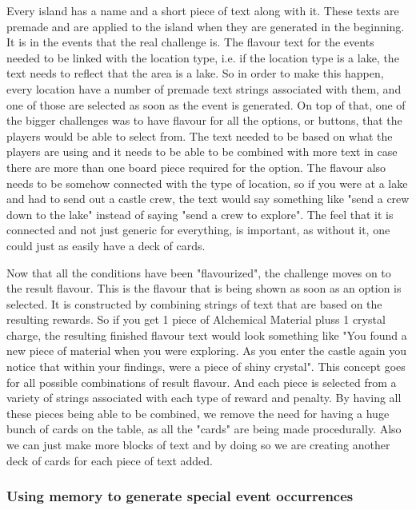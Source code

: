 Every island has a name and a short piece of text along with it. These texts are premade and are applied to the island when they are generated in the beginning. 
It is in the events that the real challenge is. The flavour text for the events needed to be linked with the location type, i.e. if the location type is a lake, the text needs to reflect that the area is a lake. So in order to make this happen, every location have a number of premade text strings associated with them, and one of those are selected as soon as the event is generated. On top of that, one of the bigger challenges was to have flavour for all the options, or buttons, that the players would be able to select from. The text needed to be based on what the players are using and it needs to be able to be combined with more text in case there are more than one board piece required for the option. The flavour also needs to be somehow connected with the type of location, so if you were at a lake and had to send out a castle crew, the text would say something like "send a crew down to the lake" instead of saying "send a crew to explore". The feel that it is connected and not just generic for everything, is important, as without it, one could just as easily have a deck of cards. 

Now that all the conditions have been "flavourized", the challenge moves on to the result flavour. This is the flavour that is being shown as soon as an option is selected. It is constructed by combining strings of text that are based on the resulting rewards. So if you get 1 piece of Alchemical Material pluss 1 crystal charge, the resulting finished flavour text would look something like "You found a new piece of material when you were exploring. As you enter the castle again you notice that within your findings, were a piece of shiny crystal". 
This concept goes for all possible combinations of result flavour. And each piece is selected from a variety of strings associated with each type of reward and penalty. By having all these pieces being able to be combined, we remove the need for having a huge bunch of cards on the table, as all the "cards" are being made procedurally. Also we can just make more blocks of text and by doing so we are creating another deck of cards for each piece of text added.


\subsubsection{Using memory to generate special event occurrences}

